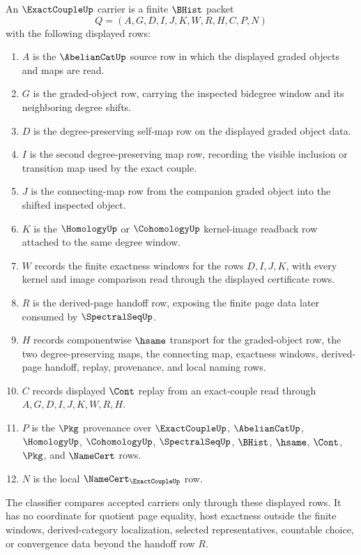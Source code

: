 \begin{definition}
\label{def:exact-couple-carrier}
An $\ExactCoupleUp$ carrier is a finite $\BHist$ packet
$$
Q=(A,G,D,I,J,K,W,R,H,C,P,N)
$$
with the following displayed rows:
\begin{enumerate}
\item $A$ is the $\AbelianCatUp$ source row in which the displayed graded objects and maps are read.
\item $G$ is the graded-object row, carrying the inspected bidegree window and its neighboring degree shifts.
\item $D$ is the degree-preserving self-map row on the displayed graded object data.
\item $I$ is the second degree-preserving map row, recording the visible inclusion or transition map used by the exact couple.
\item $J$ is the connecting-map row from the companion graded object into the shifted inspected object.
\item $K$ is the $\HomologyUp$ or $\CohomologyUp$ kernel-image readback row attached to the same degree window.
\item $W$ records the finite exactness windows for the rows $D,I,J,K$, with every kernel and image comparison read through the displayed certificate rows.
\item $R$ is the derived-page handoff row, exposing the finite page data later consumed by $\SpectralSeqUp$.
\item $H$ records componentwise $\hsame$ transport for the graded-object row, the two degree-preserving maps, the connecting map, exactness windows, derived-page handoff, replay, provenance, and local naming rows.
\item $C$ records displayed $\Cont$ replay from an exact-couple read through $A,G,D,I,J,K,W,R,H$.
\item $P$ is the $\Pkg$ provenance over $\ExactCoupleUp$, $\AbelianCatUp$, $\HomologyUp$, $\CohomologyUp$, $\SpectralSeqUp$, $\BHist$, $\hsame$, $\Cont$, $\Pkg$, and $\NameCert$ rows.
\item $N$ is the local $\NameCert_{\ExactCoupleUp}$ row.
\end{enumerate}
The classifier compares accepted carriers only through these displayed rows. It has no coordinate for quotient page equality, host exactness outside the finite windows, derived-category localization, selected representatives, countable choice, or convergence data beyond the handoff row $R$.
\end{definition}

